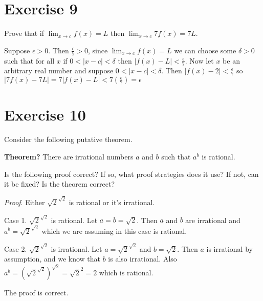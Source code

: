 \documentclass[11pt]{article}
\begin{document}
\section*{Exercise 9}

Prove that if $\lim_{x \to c} f(x) = L$ then $\lim_{x \to c} 7f(x) = 7L$.

Suppose $\epsilon > 0$. Then $\frac{\epsilon}{7} > 0$, since 
$\lim_{x \to c} f(x) = L$ we can choose some $\delta > 0$ such that for all $x$
if $0 < | x - c | < \delta$ then $| f(x) - L | < \frac{\epsilon}{7}$. Now let 
$x$ be an arbitrary real number and suppose $0 < | x - c | < \delta$. Then 
$| f(x) - 2 | < \frac{\epsilon}{7}$ so 
$| 7f(x) -7L | = 7 | f(x) - L | < 7(\frac{\epsilon}{7}) = \epsilon$

\section*{Exercise 10}

Consider the following putative theorem.

\textbf{Theorem?} There are irrational numbers $a$ and $b$ such that $a^b$ is 
rational.

Is the following proof correct? If so, what proof strategies does it use? If not,
can it be fixed? Is the theorem correct?

\textit{Proof}. Either $\sqrt{2}^{\sqrt{2}}$ is rational or it's irrational.

Case 1. $\sqrt{2}^{\sqrt{2}}$ is rational. Let $a = b = \sqrt{2}$. Then 
$a$ and $b$ are irrational and $a^b = \sqrt{2}^{\sqrt{2}}$ which we are assuming 
in this case is rational. 

Case 2. $\sqrt{2}^{\sqrt{2}}$ is irrational. Let $a = \sqrt{2}^{\sqrt{2}}$ and 
$b = \sqrt{2}$. Then $a$ is irrational by assumption, and we know that $b$ is 
also irrational. Also
$a^b = (\sqrt{2}^{\sqrt{2}})^{\sqrt{2}} = \sqrt{2}^2 = 2$ which is rational.

The proof is correct.
\end{document}
